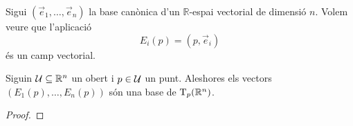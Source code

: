 \documentclass[../../Main.tex]{subfiles}
\begin{document}
	\begin{example}%
		\label{ex:camp vectorial canònic}
		Sigui \((\vec{e}_{1},\dots,\vec{e}_{n})\) la base canònica d'un \(\mathbb{R}\)-espai vectorial de dimensió \(n\). Volem veure que l'aplicació
		\[
		    E_{i}(p)=(p,\vec{e}_{i})
		\]
		és un camp vectorial.
		\begin{solution}
		\end{solution}
	\end{example}
	\begin{proposition}
		\label{prop:els camps vectorials canònics són una base de l'espai tangent}
		Siguin \(\mathcal{U}\subseteq\mathbb{R}^{n}\) un obert i \(p\in\mathcal{U}\) un punt. Aleshores els vectors \((E_{1}(p),\dots,E_{n}(p))\) són una base de \(\operatorname{T}_{p}(\mathbb{R}^{n})\).
		\begin{proof}
		\end{proof}
	\end{proposition}
\end{document}
